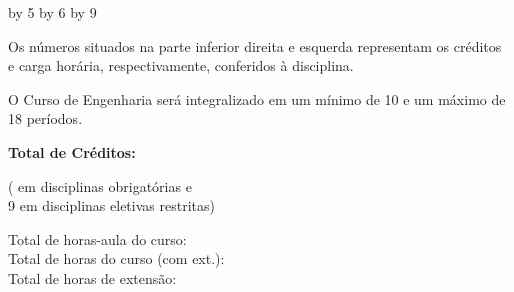 \documentclass[a4paper, landscape]{article}
\newcounter{cred}
\newcounter{thoras}
\begin{document}
\setcounter{haula}{\the\value{thoras}}
\multiply\value{thoras} by 5
\divide\value{thoras} by 6
\setcounter{hextensao}{\the\value{thoras}}
\divide\value{hextensao} by 9
\addtocounter{thoras}{\the\value{hextensao}}
\addtocounter{hextensao}{1} %

\vspace{-4mm}
\setlength\parindent{0pt}

\begin{multicols}{4}
  \vfill
  Os números situados na parte inferior direita e esquerda representam os créditos e carga horária, respectivamente, conferidos à disciplina.

  
  \columnbreak
  O Curso de Engenharia será integralizado em um mínimo de 10 e um máximo de 18 períodos.

  \columnbreak
  \textbf{Total de Créditos:} \the\value{cred}\\
  \addtocounter{cred}{-9}
  (\the\value{cred} em disciplinas obrigatórias e\\ 9 em disciplinas eletivas restritas)

  \columnbreak
  Total de horas-aula do curso: \the\value{haula}\\
  Total de horas do curso (com ext.): \the\value{thoras}\\
  Total de horas de extensão: \the\value{hextensao}

  
\end{multicols}
\end{document}
